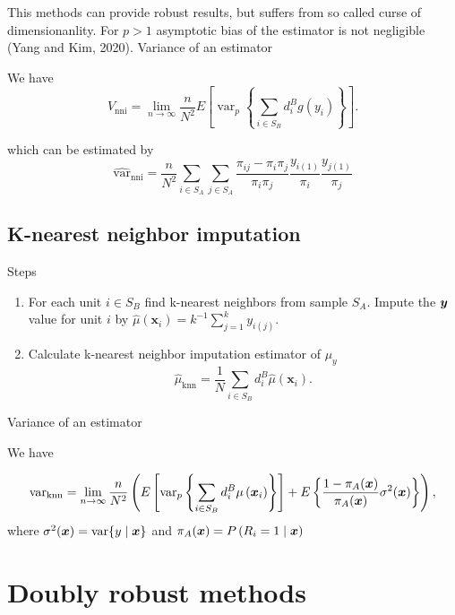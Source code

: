\documentclass[
  letterpaper,
  DIV=11,
  numbers=noendperiod]{scrreprt}
\providecommand{\tightlist}{%
  \setlength{\itemsep}{0pt}\setlength{\parskip}{0pt}}\usepackage{longtable,booktabs,array}
\begin{document}
This methods can provide robust results, but suffers from so called
curse of dimensionanlity. For \(p > 1\) asymptotic bias of the estimator
is not negligible (Yang and Kim, 2020). Variance of an estimator

We have \[
V_{\mathrm{nni}}=\lim _{n \rightarrow \infty} \frac{n}{N^2} E\left[\operatorname{var}_p\left\{\sum_{i \in S_B} d_i^B g\left(y_i\right)\right\}\right] .
\]

which can be estimated by \[
\hat{\text{var}}_{\mathrm{nni}}=\frac{n}{N^2} \sum_{i \in S_A} \sum_{j \in S_A} \frac{\pi_{i j}-\pi_i \pi_j}{\pi_i \pi_j} \frac{y_{i(1)}}{\pi_i} \frac{y_{j(1)}}{\pi_j}
\]

\hypertarget{k-nearest-neighbor-imputation}{%
\section{K-nearest neighbor
imputation}\label{k-nearest-neighbor-imputation}}

Steps

\begin{enumerate}
\def\labelenumi{\arabic{enumi}.}
\tightlist
\item
  For each unit \(i \in S_B\) find k-nearest neighbors from sample
  \(S_A\). Impute the \(\boldsymbol{y}\) value for unit \(i\) by
  \(\hat{\mu}\left(\mathbf{x}_i\right)=k^{-1} \sum_{j=1}^k y_{i(j)}\).
\item
  Calculate k-nearest neighbor imputation estimator of \(\mu_y\) \[
  \hat{\mu}_{\mathrm{knn}}=\frac{1}{N} \sum_{i \in S_B} d_i^B \hat{\mu}\left(\mathbf{x}_i\right) .
  \]
\end{enumerate}

Variance of an estimator

We have

\[
\text{var}_{\mathrm{knn}}=\lim _{n \rightarrow \infty} \frac{n}{N^2}\left(E\left[\operatorname{var}_p\left\{\sum_{i \in S_B} d_i^B \mu\left(\boldsymbol{x}_i\right)\right\}\right]+E\left\{\frac{1-\pi_A(\boldsymbol{x})}{\pi_A(\boldsymbol{x})} \sigma^2(\boldsymbol{x})\right\}\right),
\] where \(\sigma^2(\boldsymbol{x})=\operatorname{var}\{y \mid \boldsymbol{x}\}\) and
\(\pi_A(\boldsymbol{x}) = P\left(R_i=1 \mid \boldsymbol{x}\right)\)


\hypertarget{doubly-robust-methods}{%
\chapter{Doubly robust methods}\label{doubly-robust-methods}}
\end{document}
